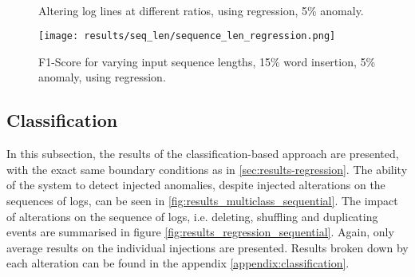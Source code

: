 \begin{figure*}[ht!]
\hspace{\fill}
\hspace{\fill}
   \\
\caption{\label{fig:results_regression_words}Altering log lines at different ratios, using regression, 5\% anomaly.}
\end{figure*}	




\begin{figure}[h]
  \centering
  \captionsetup{justification=centering}
  \texttt{[image: results/seq\_len/sequence\_len\_regression.png]}\\
  \caption{F1-Score for varying input sequence lengths, 15\% word insertion, 5\% anomaly, using regression.}
  \label{fig:seq_len_regression}
\end{figure}





\subsection{Classification \label{sec:results-classification}}
In this subsection, the results of the classification-based approach are presented, with the exact same boundary conditions as in \ref{sec:results-regression}. 
The ability of the system to detect injected anomalies, despite injected alterations on the sequences of logs, can be seen in \ref{fig:results_multiclass_sequential}. 
The impact of alterations on the sequence of logs, i.e. deleting, shuffling and duplicating events are summarised in figure \ref{fig:results_regression_sequential}. Again, only average results on the individual injections are presented. Results broken down by each alteration can be found in the appendix \ref{appendix:classification}. 

